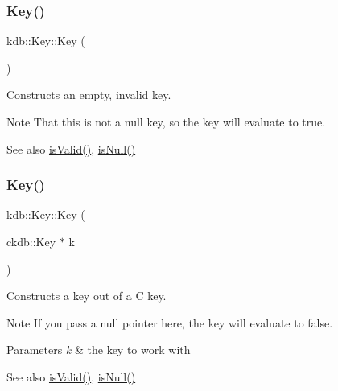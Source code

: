 \subsubsection{\texorpdfstring{Key()}{Key()}\hspace{0.1cm}{\footnotesize\ttfamily [1/7]}}
{\footnotesize\ttfamily kdb\+::\+Key\+::\+Key (\begin{DoxyParamCaption}{ }\end{DoxyParamCaption})\hspace{0.3cm}{\ttfamily [inline]}}



Constructs an empty, invalid key. 

\begin{DoxyNote}{Note}
That this is not a null key, so the key will evaluate to true.
\end{DoxyNote}
\begin{DoxySeeAlso}{See also}
\hyperlink{classkdb_1_1Key_a69e621790e5717c56f7275e0b8d5e27c}{is\+Valid()}, \hyperlink{classkdb_1_1Key_ab70b89caae5fe1e9a2e774733576fa4c}{is\+Null()} 
\end{DoxySeeAlso}
\mbox{\label{classkdb_1_1Key_a41ada34fa45a270e63444267621b59c9}} 
\subsubsection{\texorpdfstring{Key()}{Key()}\hspace{0.1cm}{\footnotesize\ttfamily [2/7]}}
{\footnotesize\ttfamily kdb\+::\+Key\+::\+Key (\begin{DoxyParamCaption}\item[{ckdb\+::\+Key $\ast$}]{k }\end{DoxyParamCaption})\hspace{0.3cm}{\ttfamily [inline]}}



Constructs a key out of a C key. 

\begin{DoxyNote}{Note}
If you pass a null pointer here, the key will evaluate to false.
\end{DoxyNote}

\begin{DoxyParams}{Parameters}
{\em k} & the key to work with\\
\hline
\end{DoxyParams}
\begin{DoxySeeAlso}{See also}
\hyperlink{classkdb_1_1Key_a69e621790e5717c56f7275e0b8d5e27c}{is\+Valid()}, \hyperlink{classkdb_1_1Key_ab70b89caae5fe1e9a2e774733576fa4c}{is\+Null()} 
\end{DoxySeeAlso}
\mbox{\label{classkdb_1_1Key_a33f63e153a7d832a54e02c0cba569feb}} 
